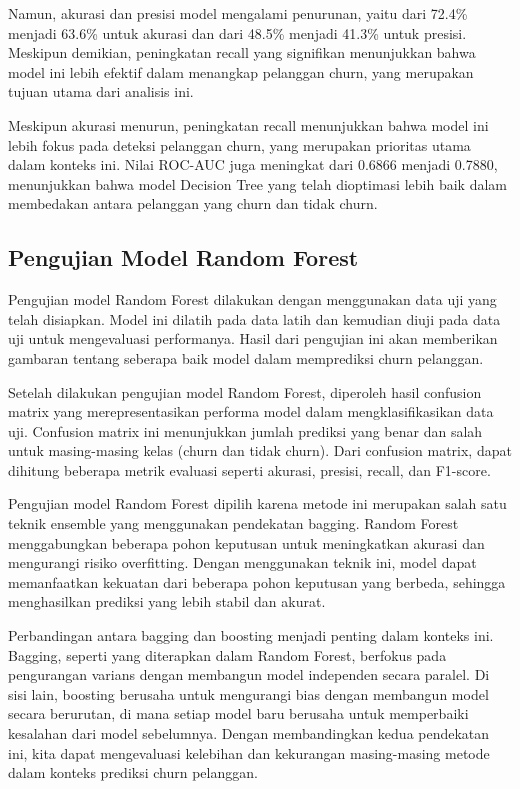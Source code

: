 Namun, akurasi dan presisi model mengalami penurunan, yaitu dari 72.4\% menjadi 63.6\% untuk akurasi dan dari 48.5\% menjadi 41.3\% untuk presisi. Meskipun demikian, peningkatan recall yang signifikan menunjukkan bahwa model ini lebih efektif dalam menangkap pelanggan churn, yang merupakan tujuan utama dari analisis ini.

Meskipun akurasi menurun, peningkatan recall menunjukkan bahwa model ini lebih fokus pada deteksi pelanggan churn, yang merupakan prioritas utama dalam konteks ini. Nilai ROC-AUC juga meningkat dari 0.6866 menjadi 0.7880, menunjukkan bahwa model Decision Tree yang telah dioptimasi lebih baik dalam membedakan antara pelanggan yang churn dan tidak churn.

\subsection{Pengujian Model Random Forest}
Pengujian model Random Forest dilakukan dengan menggunakan data uji yang telah disiapkan. Model ini dilatih pada data latih dan kemudian diuji pada data uji untuk mengevaluasi performanya. Hasil dari pengujian ini akan memberikan gambaran tentang seberapa baik model dalam memprediksi churn pelanggan.

Setelah dilakukan pengujian model Random Forest, diperoleh hasil confusion matrix yang merepresentasikan performa model dalam mengklasifikasikan data uji. Confusion matrix ini menunjukkan jumlah prediksi yang benar dan salah untuk masing-masing kelas (churn dan tidak churn). Dari confusion matrix, dapat dihitung beberapa metrik evaluasi seperti akurasi, presisi, recall, dan F1-score.

Pengujian model Random Forest dipilih karena metode ini merupakan salah satu teknik ensemble yang menggunakan pendekatan bagging. Random Forest menggabungkan beberapa pohon keputusan untuk meningkatkan akurasi dan mengurangi risiko overfitting. Dengan menggunakan teknik ini, model dapat memanfaatkan kekuatan dari beberapa pohon keputusan yang berbeda, sehingga menghasilkan prediksi yang lebih stabil dan akurat.

Perbandingan antara bagging dan boosting menjadi penting dalam konteks ini. Bagging, seperti yang diterapkan dalam Random Forest, berfokus pada pengurangan varians dengan membangun model independen secara paralel. Di sisi lain, boosting berusaha untuk mengurangi bias dengan membangun model secara berurutan, di mana setiap model baru berusaha untuk memperbaiki kesalahan dari model sebelumnya. Dengan membandingkan kedua pendekatan ini, kita dapat mengevaluasi kelebihan dan kekurangan masing-masing metode dalam konteks prediksi churn pelanggan.

